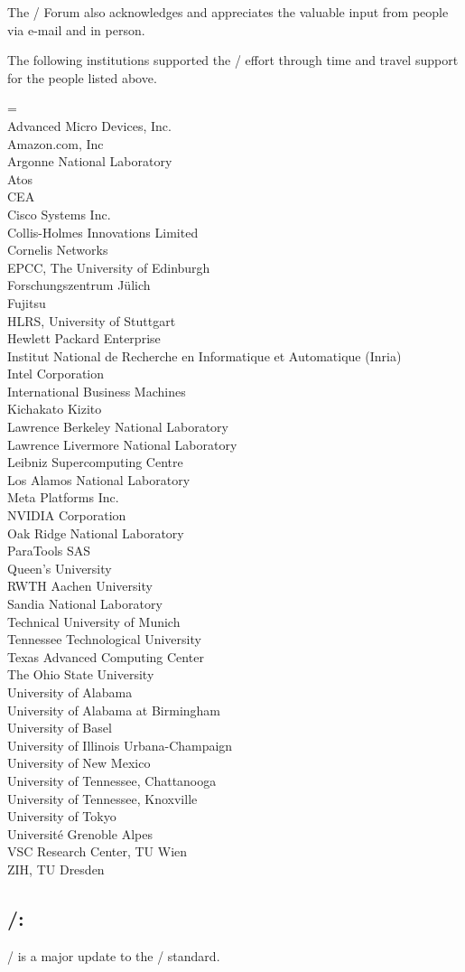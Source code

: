 The \MPI/ Forum also acknowledges and appreciates the valuable input
from people via e-mail and in person.


The following institutions supported the \MPIIVDOTI/ effort through
time and travel support for the people listed above.

\medskip

\begin{obeylines}\leftskip=\parindent\parindent=0pt %
Advanced Micro Devices, Inc.
Amazon.com, Inc
Argonne National Laboratory
Atos
CEA
Cisco Systems Inc.
Collis-Holmes Innovations Limited
Cornelis Networks
EPCC, The University of Edinburgh
Forschungszentrum J\"ulich
Fujitsu
HLRS, University of Stuttgart
Hewlett Packard Enterprise
Institut National de Recherche en Informatique et Automatique (Inria)
Intel Corporation
International Business Machines
Kichakato Kizito
Lawrence Berkeley National Laboratory
Lawrence Livermore National Laboratory
Leibniz Supercomputing Centre
Los Alamos National Laboratory
Meta Platforms Inc.
NVIDIA Corporation
Oak Ridge National Laboratory
ParaTools SAS
Queen's University
RWTH Aachen University
Sandia National Laboratory
Technical University of Munich
Tennessee Technological University
Texas Advanced Computing Center
The Ohio State University
University of Alabama
University of Alabama at Birmingham
University of Basel
University of Illinois Urbana-Champaign
University of New Mexico
University of Tennessee, Chattanooga
University of Tennessee, Knoxville
University of Tokyo
Université Grenoble Alpes
VSC Research Center, TU Wien
ZIH, TU Dresden
\end{obeylines}

\subsection*{\MPIVDOTO/:}
\MPIVDOTO/ is a major update to the \MPI/ standard.


